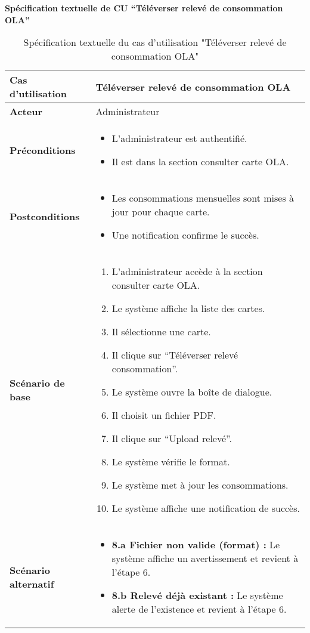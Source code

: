 \documentclass[a4paper,11pt]{report}
\begin{document}
\textbf{Spécification textuelle de CU “Téléverser relevé de consommation OLA”}

\begin{table}[H]
  \centering
  \renewcommand{\arraystretch}{1.5}
  \caption{Spécification textuelle du cas d'utilisation "Téléverser relevé de consommation OLA"}
  \begin{tabularx}{\textwidth}{|l|X|}
    \hline
    \textbf{Cas d'utilisation} & Téléverser relevé de consommation OLA \\ \hline
    \textbf{Acteur}            & Administrateur \\ \hline
    \textbf{Préconditions}     & 
      \begin{itemize}
        \item L’administrateur est authentifié.
        \item Il est dans la section consulter carte OLA.
      \end{itemize} \\ \hline
    \textbf{Postconditions}    & 
      \begin{itemize}
        \item Les consommations mensuelles sont mises à jour pour chaque carte.
        \item Une notification confirme le succès.
      \end{itemize} \\ \hline
    \textbf{Scénario de base}  & 
      \begin{enumerate}
        \item L’administrateur accède à la section consulter carte OLA.
        \item Le système affiche la liste des cartes.
        \item Il sélectionne une carte.
        \item Il clique sur “Téléverser relevé consommation”.
        \item Le système ouvre la boîte de dialogue.
        \item Il choisit un fichier PDF.
        \item Il clique sur “Upload relevé”.
        \item Le système vérifie le format.
        \item Le système met à jour les consommations.
        \item Le système affiche une notification de succès.
      \end{enumerate} \\ \hline
    \textbf{Scénario alternatif} & 
      \begin{itemize}
        \item \textbf{8.a Fichier non valide (format) :} Le système affiche un avertissement et revient à l’étape 6.
        \item \textbf{8.b Relevé déjà existant :} Le système alerte de l’existence et revient à l’étape 6.
      \end{itemize} \\ \hline
  \end{tabularx}
\end{table}
\end{document}
